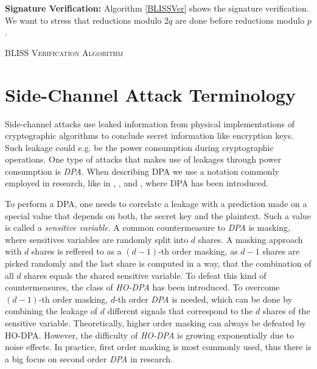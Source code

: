 \textbf{Signature Verification:} Algorithm \ref{BLISSVer} shows the signature verification. We want to stress that reductions modulo \(2q\) are done before reductions modulo \(p\).
\begin{algorithm}
    \label{BLISSVer}
    \caption{\textsc{BLISS Verification Algorithm}}
    \begin{algorithmic}[1]
    	\EndIf
    	\EndIf
    \end{algorithmic}
\end{algorithm}

\section{Side-Channel Attack Terminology}
Side-channel attacks use leaked information from physical implementations of cryptographic algorithms to conclude secret information like encryption keys. Such leakage could e.g. be the power consumption during cryptographic operations. One type of attacks that makes use of leakages through power consumption is \textit{\ac{DPA}}. When describing \ac{DPA} we use a notation commonly employed in research, like in \cite{cryptoeprint:2010:646}, \cite{cryptoeprint:2010:385}, \cite{DBLP:conf/crypto/KocherJJ99} and \cite{Kocher2011}, where \acl{DPA} has been introduced.

To perform a DPA, one needs to correlate a leakage with a prediction made on a special value that depends on both, the secret key and the plaintext. Such a value is called a \textit{sensitive variable}. A common countermeasure to \textit{\ac{DPA}} is masking, where sensitives variables are randomly split into \(d\) shares. A masking approach with \(d\) shares is reffered to as a \((d-1)\)-th order masking, as \(d-1\) shares are picked randomly and the last share is computed in a way, that the combination of all \(d\) shares equals the shared sensitive variable. To defeat this kind of countermeasures, the class of \textit{\ac{HO-DPA}} has been introduced. To overcome \((d-1)\)-th order masking, \(d\)-th order \textit{\ac{DPA}} is needed, which can be done by combining the leakage of \(d\) different signals that correspond to the \(d\) shares of the sensitive variable. Theoretically, higher order masking can always be defeated by HO-DPA. However, the difficulty of \textit{\ac{HO-DPA}} is growing exponentially due to noise effects. In practice, first order masking is most commonly used, thus there is a big focus on second order \textit{\ac{DPA}} in research.